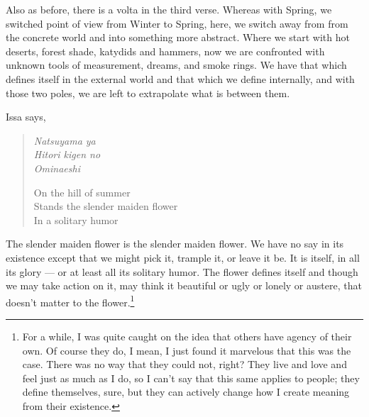 \documentclass[12pt,oneside]{memoir}
\begin{document}
Also as before, there is a volta in the third verse. Whereas with Spring, we switched point of view from Winter to Spring, here, we switch away from from the concrete world and into something more abstract. Where we start with hot deserts, forest shade, katydids and hammers, now we are confronted with unknown tools of measurement, dreams, and smoke rings. We have that which defines itself in the external world and that which we define internally, and with those two poles, we are left to extrapolate what is between them.

Issa says,

\begin{verse}
\begin{multicols}{2}
\emph{Natsuyama ya} \\
\emph{Hitori kigen no} \\
\emph{Ominaeshi}

\columnbreak

On the hill of summer \\
Stands the slender maiden flower \\
In a solitary humor
\end{multicols}
\parencite[65]{issa}
\end{verse}

The slender maiden flower is the slender maiden flower. We have no say in its existence except that we might pick it, trample it, or leave it be. It is itself, in all its glory --- or at least all its solitary humor. The flower defines itself and though we may take action on it, may think it beautiful or ugly or lonely or austere, that doesn't matter to the flower.\footnote{For a while, I was quite caught on the idea that others have agency of their own. Of course they do, I mean, I just found it marvelous that this was the case. There was no way that they could not, right? They live and love and feel just as much as I do, so I can't say that this same applies to people; they define themselves, sure, but they can actively change how I create meaning from their existence.\footnotemark}
\end{document}
